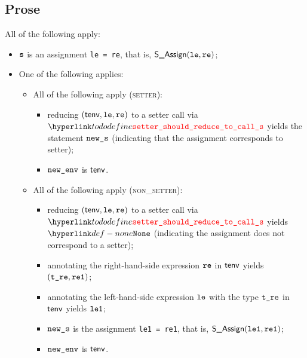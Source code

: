 \documentclass{book}
\newcommand\ProseOrTypeError[0]{\ProseTerminateAs{\TypeErrorConfig}}
\newcommand\inlinesetter[0]{\tododefine{setter\_should\_reduce\_to\_call\_s}}
\begin{document}
\subsection{Prose}
All of the following apply:
\begin{itemize}
  \item $\texttt{s}$ is an assignment \texttt{le = re}, that is, $\textsf{S\_Assign}(\texttt{le}, \texttt{re})$;
  \item One of the following applies:
  \begin{itemize}
    \item All of the following apply (\textsc{setter}):
    \begin{itemize}
      \item reducing $(\textsf{tenv}, \texttt{le}, \texttt{re})$ to a setter call via \\ $\inlinesetter$ yields the statement $\texttt{new\_s}$
      (indicating that the assignment corresponds to setter)\ProseOrTypeError;
      \item $\texttt{new\_env}$ is $\textsf{tenv}$.
    \end{itemize}

    \item All of the following apply (\textsc{non\_setter}):
    \begin{itemize}
      \item reducing $(\textsf{tenv}, \texttt{le}, \texttt{re})$ to a setter call via \\ $\inlinesetter$ yields $\None$
            (indicating the assignment does not correspond to a setter);
      \item annotating the right-hand-side expression $\texttt{re}$ in $\textsf{tenv}$ yields $(\texttt{t\_re}, \texttt{re1})$\ProseOrTypeError;
      \item annotating the left-hand-side expression $\texttt{le}$ with the type $\texttt{t\_re}$ in $\textsf{tenv}$ yields $\texttt{le1}$\ProseOrTypeError;
      \item $\texttt{new\_s}$ is the assignment \texttt{le1 = re1}, that is, $\textsf{S\_Assign}(\texttt{le1}, \texttt{re1})$;
      \item $\texttt{new\_env}$ is $\textsf{tenv}$.
    \end{itemize}

  \end{itemize}
\end{itemize}


\end{document}
